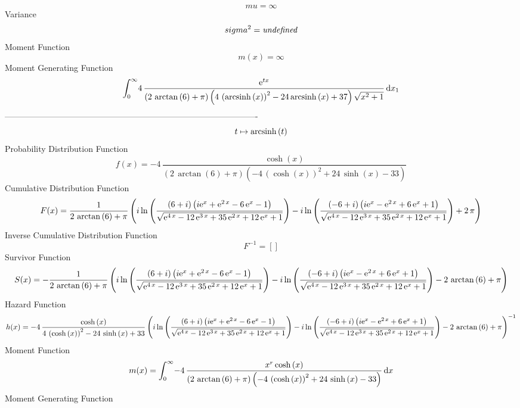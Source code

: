 \documentclass[12pt]{article}
\begin{document}
 $$ mu=\infty 
$$ Variance 
 $$ sigma^2 = {\it undefined}
$$Moment Function 
 $$ m(x) = \infty 
$$ Moment Generating Function 
 $$\int_{0}^{\infty }\!4\,{\frac {{{\rm e}^{tx}}}{ \left( 2\,\arctan
 \left( 6 \right) +\pi \right)  \left( 4\, \left( {\rm arcsinh} \left(
x\right) \right) ^{2}-24\,{\rm arcsinh} \left(x\right)+37 \right) 
\sqrt {{x}^{2}+1}}}\,{\rm d}x_{{1}}
$$-------------------------------------------------------------------------------------------  \\$$t\mapsto {\rm arcsinh} \left(t\right)
$$Probability Distribution Function 
$$  f(x)=-4\,{\frac {\cosh \left( x \right) }{ \left( 2\,\arctan \left( 6
 \right) +\pi \right)  \left( -4\, \left( \cosh \left( x \right) 
 \right) ^{2}+24\,\sinh \left( x \right) -33 \right) }}
$$Cumulative Distribution Function  
 $$F(x)={\frac {1}{2\,\arctan \left( 6 \right) +\pi} \left( i\ln  \left( {
\frac { \left( 6+i \right)  \left( i{{\rm e}^{x}}+{{\rm e}^{2\,x}}-6\,
{{\rm e}^{x}}-1 \right) }{\sqrt {{{\rm e}^{4\,x}}-12\,{{\rm e}^{3\,x}}
+35\,{{\rm e}^{2\,x}}+12\,{{\rm e}^{x}}+1}}} \right) -i\ln  \left( {
\frac { \left( -6+i \right)  \left( i{{\rm e}^{x}}-{{\rm e}^{2\,x}}+6
\,{{\rm e}^{x}}+1 \right) }{\sqrt {{{\rm e}^{4\,x}}-12\,{{\rm e}^{3\,x
}}+35\,{{\rm e}^{2\,x}}+12\,{{\rm e}^{x}}+1}}} \right) +2\,\pi
 \right) }
$$ Inverse Cumulative Distribution Function 
  $$F^{-1} = []
$$Survivor Function 
 $$ S(x)=-{\frac {1}{2\,\arctan \left( 6 \right) +\pi} \left( i\ln  \left( {
\frac { \left( 6+i \right)  \left( i{{\rm e}^{x}}+{{\rm e}^{2\,x}}-6\,
{{\rm e}^{x}}-1 \right) }{\sqrt {{{\rm e}^{4\,x}}-12\,{{\rm e}^{3\,x}}
+35\,{{\rm e}^{2\,x}}+12\,{{\rm e}^{x}}+1}}} \right) -i\ln  \left( {
\frac { \left( -6+i \right)  \left( i{{\rm e}^{x}}-{{\rm e}^{2\,x}}+6
\,{{\rm e}^{x}}+1 \right) }{\sqrt {{{\rm e}^{4\,x}}-12\,{{\rm e}^{3\,x
}}+35\,{{\rm e}^{2\,x}}+12\,{{\rm e}^{x}}+1}}} \right) -2\,\arctan
 \left( 6 \right) +\pi \right) }
$$ Hazard Function 
 $$ h(x)=-4\,{\frac {\cosh \left( x \right) }{4\, \left( \cosh \left( x
 \right)  \right) ^{2}-24\,\sinh \left( x \right) +33} \left( i\ln 
 \left( {\frac { \left( 6+i \right)  \left( i{{\rm e}^{x}}+{{\rm e}^{2
\,x}}-6\,{{\rm e}^{x}}-1 \right) }{\sqrt {{{\rm e}^{4\,x}}-12\,{
{\rm e}^{3\,x}}+35\,{{\rm e}^{2\,x}}+12\,{{\rm e}^{x}}+1}}} \right) -i
\ln  \left( {\frac { \left( -6+i \right)  \left( i{{\rm e}^{x}}-{
{\rm e}^{2\,x}}+6\,{{\rm e}^{x}}+1 \right) }{\sqrt {{{\rm e}^{4\,x}}-
12\,{{\rm e}^{3\,x}}+35\,{{\rm e}^{2\,x}}+12\,{{\rm e}^{x}}+1}}}
 \right) -2\,\arctan \left( 6 \right) +\pi \right) ^{-1}}
$$Moment Function 
 $$ m(x) = \int_{0}^{\infty }\!-4\,{\frac {{x}^{r}\cosh \left( x \right) }{
 \left( 2\,\arctan \left( 6 \right) +\pi \right)  \left( -4\, \left( 
\cosh \left( x \right)  \right) ^{2}+24\,\sinh \left( x \right) -33
 \right) }}\,{\rm d}x
$$ Moment Generating Function 
\end{document}
